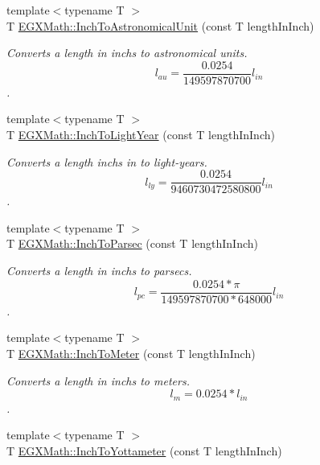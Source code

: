 \begin{DoxyCompactItemize}
\item 
{\footnotesize template$<$typename T $>$ }\\T \mbox{\hyperlink{group___e_g_x_math-_conversions-_length_conversions-_imperial-_inch-_astronomical_ga3d2920dc1a8ee693fd011be23d37c5ca}{E\+G\+X\+Math\+::\+Inch\+To\+Astronomical\+Unit}} (const T length\+In\+Inch)
\begin{DoxyCompactList}\small\item\em Converts a length in inchs to astronomical units. \[ l_{au}=\frac{0.0254}{149597870700} l_{in} \]. \end{DoxyCompactList}\item 
{\footnotesize template$<$typename T $>$ }\\T \mbox{\hyperlink{group___e_g_x_math-_conversions-_length_conversions-_imperial-_inch-_astronomical_ga3dc74f0303c8db4674f23ba6a99d150b}{E\+G\+X\+Math\+::\+Inch\+To\+Light\+Year}} (const T length\+In\+Inch)
\begin{DoxyCompactList}\small\item\em Converts a length inchs in to light-\/years. \[ l_{ly}=\frac{0.0254}{9460730472580800} l_{in} \]. \end{DoxyCompactList}\item 
{\footnotesize template$<$typename T $>$ }\\T \mbox{\hyperlink{group___e_g_x_math-_conversions-_length_conversions-_imperial-_inch-_astronomical_ga5a93231e0372e2fe2c27ef5405175784}{E\+G\+X\+Math\+::\+Inch\+To\+Parsec}} (const T length\+In\+Inch)
\begin{DoxyCompactList}\small\item\em Converts a length in inchs to parsecs. \[ l_{pc}=\frac{0.0254 * \pi}{149597870700 * 648000} l_{in} \]. \end{DoxyCompactList}\item 
{\footnotesize template$<$typename T $>$ }\\T \mbox{\hyperlink{group___e_g_x_math-_conversions-_length_conversions-_imperial-_inch-_s_i_ga945abc9740e48bb25302203731967474}{E\+G\+X\+Math\+::\+Inch\+To\+Meter}} (const T length\+In\+Inch)
\begin{DoxyCompactList}\small\item\em Converts a length in inchs to meters. \[ l_{m}=0.0254 * l_{in} \]. \end{DoxyCompactList}\item 
{\footnotesize template$<$typename T $>$ }\\T \mbox{\hyperlink{group___e_g_x_math-_conversions-_length_conversions-_imperial-_inch-_s_i_ga366239d2cec41e7c095c9e73fa4ee7f3}{E\+G\+X\+Math\+::\+Inch\+To\+Yottameter}} (const T length\+In\+Inch)

\end{DoxyCompactItemize}
